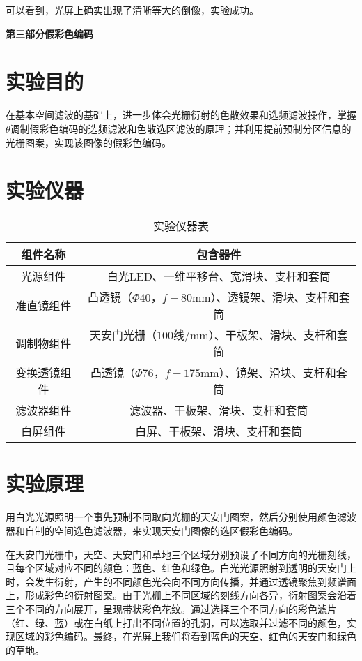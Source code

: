 \documentclass[11pt]{article}
\newcommand{\chapter}[2]{\begin{center}\bf\Large{第#1部分\quad #2}\end{center}}
\begin{document}
可以看到，光屏上确实出现了清晰等大的倒像，实验成功。

\setcounter{section}{0}

\chapter{三}{假彩色编码}

\section{实验目的}

在基本空间滤波的基础上，进一步体会光栅衍射的色散效果和选频滤波操作，掌握$\theta$调制假彩色编码的选频滤波和色散选区滤波的原理；并利用提前预制分区信息的光栅图案，实现该图像的假彩色编码。

\section{实验仪器}

\begin{table}[H]
    \centering
    \begin{tabular}{|c|c|}\hline
        组件名称 & 包含器件\\ \hline
        光源组件& 白光LED、一维平移台、宽滑块、支杆和套筒\\ \hline
        准直镜组件& 凸透镜（$\Phi 40$，$f-80$mm）、透镜架、滑块、支杆和套筒 \\ \hline
        调制物组件& 天安门光栅（$100$线/mm）、干板架、滑块、支杆和套筒\\ \hline
        变换透镜组件& 凸透镜（$\Phi 76$，$f-175$mm）、镜架、滑块、支杆和套筒\\ \hline
        滤波器组件& 滤波器、干板架、滑块、支杆和套筒\\ \hline
        白屏组件& 白屏、干板架、滑块、支杆和套筒\\ \hline
    \end{tabular}
    \caption{实验仪器表}
\end{table}

\section{实验原理}

用白光光源照明一个事先预制不同取向光栅的天安门图案，然后分别使用颜色滤波器和自制的空间选色滤波器，来实现天安门图像的选区假彩色编码。

在天安门光栅中，天空、天安门和草地三个区域分别预设了不同方向的光栅刻线，且每个区域对应不同的颜色：蓝色、红色和绿色。白光光源照射到透明的天安门上时，会发生衍射，产生的不同颜色光会向不同方向传播，并通过透镜聚焦到频谱面上，形成彩色的衍射图案。由于光栅上不同区域的刻线方向各异，衍射图案会沿着三个不同的方向展开，呈现带状彩色花纹。通过选择三个不同方向的彩色滤片（红、绿、蓝）或在白纸上打出不同位置的孔洞，可以选取并过滤不同的颜色，实现区域的彩色编码。最终，在光屏上我们将看到蓝色的天空、红色的天安门和绿色的草地。
\end{document}
